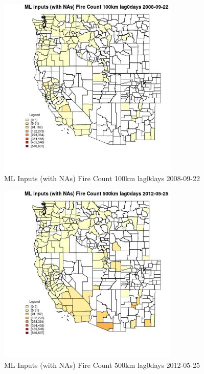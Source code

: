 \begin{figure} 
\centering  
\includegraphics[width=0.77\textwidth]{Code_Outputs/Report_ML_input_PM25_Step4_part_e_de_duplicated_aves_compiled_2019-05-18wNAs_CountyFire_Count_100km_lag0daysMean2008-09-22.jpg} 
\caption{\label{fig:Report_ML_input_PM25_Step4_part_e_de_duplicated_aves_compiled_2019-05-18wNAsCountyFire_Count_100km_lag0daysMean2008-09-22}ML Inputs (with NAs) Fire Count 100km lag0days 2008-09-22} 
\end{figure} 
 

\begin{figure} 
\centering  
\includegraphics[width=0.77\textwidth]{Code_Outputs/Report_ML_input_PM25_Step4_part_e_de_duplicated_aves_compiled_2019-05-18wNAs_CountyFire_Count_500km_lag0daysMean2012-05-25.jpg} 
\caption{\label{fig:Report_ML_input_PM25_Step4_part_e_de_duplicated_aves_compiled_2019-05-18wNAsCountyFire_Count_500km_lag0daysMean2012-05-25}ML Inputs (with NAs) Fire Count 500km lag0days 2012-05-25} 
\end{figure} 
 

